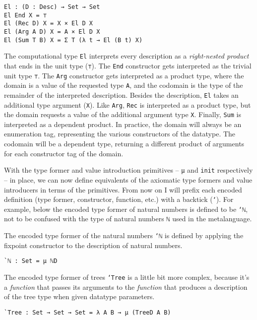 \documentclass[runningheads,a4paper]{llncs}
\begin{document}
\begin{verbatim}
El : (D : Desc) → Set → Set
El End X = ⊤
El (Rec D) X = X × El D X
El (Arg A D) X = A × El D X
El (Sum T B) X = Σ T (λ t → El (B t) X)
\end{verbatim}

The computational type {\tt El} interprets every description as a
{\it right-nested product} that ends in the unit type ({\tt ⊤}).
The {\tt End} constructor gets interpreted as the trivial unit type
{\tt ⊤}. The {\tt Arg} constructor gets interpreted as a product type,
where the domain is a value of the requested type {\tt A}, and the
codomain is the type of the remainder of the interpreted description.
Besides the description, {\tt El} takes an additional
type argument ({\tt X}). Like {\tt Arg}, {\tt Rec} is interpreted as a product
type, but the domain requests a value of the additional argument type
{\tt X}. Finally, {\tt Sum} is interpreted as a dependent product. In
practice, the domain will always be an enumeration tag, representing
the various constructors of the datatype. The codomain will be a
dependent type, returning a different product of arguments for each
constructor tag of the domain.

With the type former and value introduction primitives -- {\tt μ} and
{\tt init} respectively -- in place, we can now define equivalents of
the axiomatic type formers and value introducers in terms of the
primitives. From now on I will prefix each encoded definition (type former,
constructor, function, etc.) with a backtick ({\tt `}). For example,
below the encoded type former of natural numbers is defined to be {\tt `ℕ},
not to be confused with the type of natural numbers {\tt ℕ} used in
the metalanguage.

The encoded type former of the natural numbers {\tt `ℕ} is defined
by applying the fixpoint constructor to the description of natural
numbers.

\begin{verbatim}
`ℕ : Set = μ ℕD
\end{verbatim}

The encoded type former of trees {\tt `Tree} is a little bit
more complex, because it's a {\it function} that passes its arguments to the
{\it function} that produces a description of the tree type when given
datatype parameters.

\begin{verbatim}
`Tree : Set → Set → Set = λ A B → μ (TreeD A B)
\end{verbatim}
\end{document}
